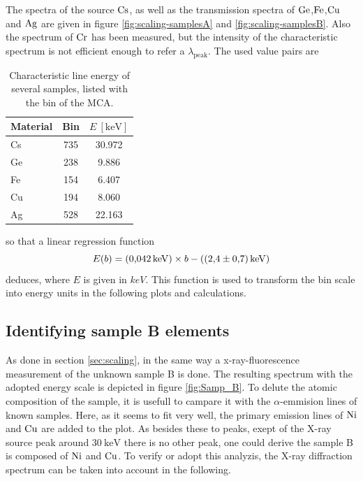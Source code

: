 The spectra of the source $\ce{Cs}$, as well as the transmission spectra of $\ce{Ge}$,$\ce{Fe}$,$\ce{Cu}$ and $\ce{Ag}$ are given in figure \ref{fig:scaling-samplesA} and \ref{fig:scaling-samplesB}.
Also the spectrum of $\ce{Cr}$ has been measured, but the intensity of the characteristic spectrum is not efficient enough to refer a $\lambda_\text{peak}$.
The used value pairs are
\begin{table}
    \caption{Characteristic \alpha line energy of several samples, listed with the bin of the MCA.}
    \label{tab:bin-E}
    \centering
    \begin{tabular}{l S[table-format=3.0] S[table-format=3.3]}
          \toprule
          {Material} & {Bin} & {$E \: [\si{\kilo\eV}]$} \\
          \midrule
          {Cs} & 735 & 30.972 \\
          {Ge} & 238 & 9.886  \\
          {Fe} & 154 & 6.407 \\
          {Cu} & 194 & 8.060 \\
          {Ag} & 528 & 22.163  \\
          \bottomrule
    \end{tabular}
\end{table}
so that a linear regression function 
\begin{equation*}
    E(b) = (\SI{ 0.042 \pm 0.000 }{\kilo\eV}) \times b - (\SI{2.4 \pm 0.7}{\kilo\eV})
\end{equation*}
deduces, where $E$ is given in $keV$. 
This function is used to transform the bin scale into energy units in the following plots and calculations.

\subsection{Identifying sample B elements}
\label{sec:sampleB-fluo}

As done in section \ref{sec:scaling}, in the same way a x-ray-fluorescence measurement of the unknown sample B is done.
The resulting spectrum with the adopted energy scale is depicted in figure \ref{fig:Samp_B}. 
To delute the atomic composition of the sample, it is usefull to campare it with the $\alpha$-emmision lines of known samples.
Here, as it seems to fit very well, the primary emission lines of $\ce{Ni}$ and $\ce{Cu}$ are added to the plot.
As besides these to peaks, exept of the X-ray source peak around $\SI{30}{\kilo\eV}$ there is no other peak, one could derive the sample B is composed of $\ce{Ni}$ and $\ce{Cu}$.
To verify or adopt this analyzis, the X-ray diffraction spectrum can be taken into account in the following.

